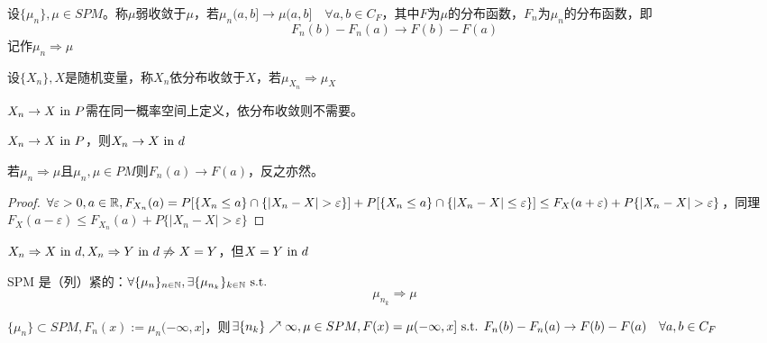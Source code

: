 \documentclass{ctexart}
\begin{document}
\begin{Def}
  设$\{\mu_{n}\},\mu\in SPM$。称$\mu$弱收敛于$\mu$，若$\mu_{n}(a,b]\to\mu(a,b]\quad \forall a,b\in C_{F}$，其中$F$为$\mu$的分布函数，$F_{n}$为$\mu_{n}$的分布函数，即
  \[F_{n}(b)-F_{n}(a)\to F(b)-F(a)\]
  记作$\mu_{n}\Rightarrow \mu$
\end{Def}

\begin{Def}
  设$\{X_{n}\},X$是随机变量，称$X_{n}$依分布收敛于$X$，若$\mu_{X_{n}}\Rightarrow \mu_{X}$
\end{Def}

\begin{Rmk}
  $X_{n}\to X\text{ in } P$需在同一概率空间上定义，依分布收敛则不需要。
\end{Rmk}

\begin{Prop}
  $X_{n}\to X\text{ in } P$，则$X_{n}\to X\text{ in } d$
\end{Prop}
\begin{Rmk}
  若$\mu_{n}\Rightarrow\mu$且$\mu_{n},\mu\in PM$则$F_{n}(a)\to F(a)$，反之亦然。
\end{Rmk}

\begin{proof}
  $\forall\varepsilon>0,a\in\R,F_{X_{n}}(a)=P[\{X_{n}\leq a\}\cap \{|X_{n}-X|>\varepsilon\}]+P[\{X_{n}\leq a\}\cap \{|X_{n}-X|\leq\varepsilon\}]\leq F_{X}(a+\varepsilon)+P\{|X_{n}-X|>\varepsilon\}$，同理$F_{X}(a-\varepsilon)\leq F_{X_{n}}(a)+P\{|X_{n}-X|>\varepsilon\}$
\end{proof}

\begin{Prop}
  $X_{n}\Rightarrow X\text{ in } d,X_{n}\Rightarrow Y \text{ in } d\not \Rightarrow X=Y$，但$X=Y\text{ in } d$
\end{Prop}

\begin{Prop}
  SPM 是（列）紧的：$\forall \{\mu_{n}\}_{n\in\mathbb{N}},\exists \{\mu_{n_{k}}\}_{k\in\mathbb{N}}\text{ s.t. }$
  \[\mu_{n_{k}}\Rightarrow \mu\]
\end{Prop}

\begin{Prop}
  $\{\mu_{n}\}\subset SPM, F_{n}(x):=\mu_{n}(-\infty,x]$，则$\exists \{n_{k}\}\nearrow\infty,\mu\in SPM, F(x)=\mu(-\infty,x]\text{ s.t. } F_{n}(b)-F_{n}(a)\to F(b)-F(a)\quad \forall a,b\in C_{F}$
\end{Prop}
\end{document}
